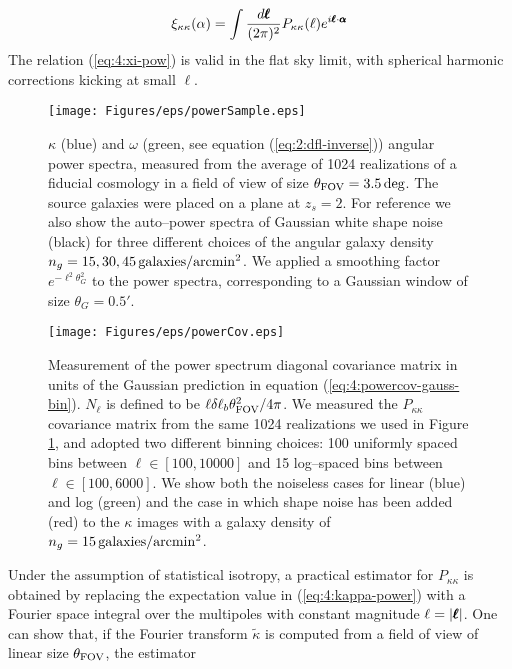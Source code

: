 \begin{equation}
\label{eq:4:xi-pow}
\xi_{\kappa\kappa}(\alpha) = \int \frac{d\pmb{\ell}}{(2\pi)^2}P_{\kappa\kappa}(\ell)e^{i\pmb{\ell}\cdot\pmb{\alpha}}
\end{equation}
%
The relation (\ref{eq:4:xi-pow}) is valid in the flat sky limit, with spherical harmonic corrections kicking at small $\ell$.
%
\begin{figure}
\begin{center}
\texttt{[image: Figures/eps/powerSample.eps]}
\end{center}
\caption{$\kappa$ (blue) and $\omega$ (green, see equation (\ref{eq:2:dfl-inverse})) angular power spectra, measured from the average of 1024 realizations of a fiducial cosmology in a field of view of size $\theta_{\rm FOV}=3.5\,{\rm deg}$. The source galaxies were placed on a plane at $z_s=2$. For reference we also show the auto--power spectra of Gaussian white shape noise (black) for three different choices of the angular galaxy density $n_g=15,30,45\,{\rm galaxies}/{\rm arcmin}^2$. We applied a smoothing factor $e^{-\ell^2\theta_G^2}$ to the power spectra, corresponding to a Gaussian window of size $\theta_G=0.5'$.}
\label{fig:4:psample}
\end{figure}
%
\begin{figure}
\begin{center}
\texttt{[image: Figures/eps/powerCov.eps]}
\end{center}
\caption{Measurement of the power spectrum diagonal covariance matrix in units of the Gaussian prediction in equation (\ref{eq:4:powercov-gauss-bin}). $N_\ell$ is defined to be $\ell\delta\ell_b\theta_{\rm FOV}^2/4\pi$. We measured the $P_{\kappa\kappa}$ covariance matrix from the same 1024 realizations we used in Figure \ref{fig:4:psample}, and adopted two different binning choices: 100 uniformly spaced bins between $\ell\in[100,10000]$ and 15 log--spaced bins between $\ell\in[100,6000]$. We show both the noiseless cases for linear (blue) and log (green) and the case in which shape noise has been added (red) to the $\kappa$ images with a galaxy density of $n_g=15\,{\rm galaxies}/{\rm arcmin}^2$.}
\label{fig:4:pcov}
\end{figure}
%
Under the assumption of statistical isotropy, a practical estimator for $P_{\kappa\kappa}$ is obtained by replacing the expectation value in (\ref{eq:4:kappa-power}) with a Fourier space integral over the multipoles with constant magnitude $\ell=\vert\pmb{\ell}\vert$. One can show that, if the Fourier transform $\tilde{\kappa}$ is computed from a field of view of linear size $\theta_{\rm FOV}$, the estimator

